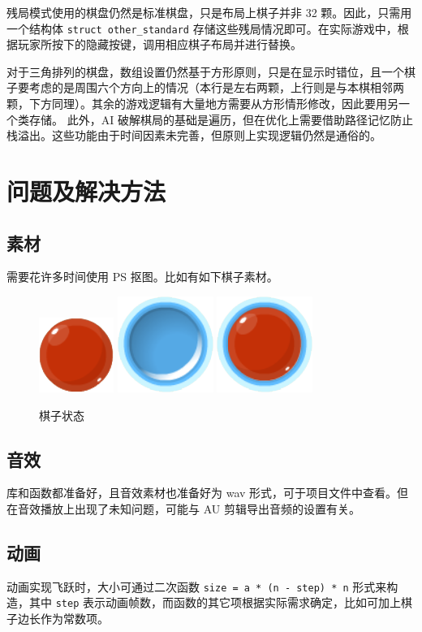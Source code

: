 \documentclass[12pt,a4paper,twoside]{ctexart}
\numberwithin{figure}{section}
\numberwithin{equation}{section}
\begin{document}
残局模式使用的棋盘仍然是标准棋盘，只是布局上棋子并非 32 颗。因此，只需用一个结构体 \verb|struct other_standard| 存储这些残局情况即可。在实际游戏中，根据玩家所按下的隐藏按键，调用相应棋子布局并进行替换。

对于三角排列的棋盘，数组设置仍然基于方形原则，只是在显示时错位，且一个棋子要考虑的是周围六个方向上的情况（本行是左右两颗，上行则是与本棋相邻两颗，下方同理）。其余的游戏逻辑有大量地方需要从方形情形修改，因此要用另一个类存储。 此外，AI 破解棋局的基础是遍历，但在优化上需要借助路径记忆防止栈溢出。这些功能由于时间因素未完善，但原则上实现逻辑仍然是通俗的。



\newpage
\section{问题及解决方法}
\subsection{素材}
需要花许多时间使用 PS 抠图。比如有如下棋子素材。

\begin{figure}[ht]
    \centering
    \includegraphics[width=.1\textwidth]{piece.png}
    \quad
    \includegraphics[width=.1\textwidth]
    {piece_moveTo.png}
    \quad
    \includegraphics[width=.1\textwidth]
    {piece_resized.png}
    \caption{棋子状态}
\end{figure}

\subsection{音效}
库和函数都准备好，且音效素材也准备好为 wav 形式，可于项目文件中查看。但在音效播放上出现了未知问题，可能与 AU 剪辑导出音频的设置有关。

\subsection{动画}
动画实现飞跃时，大小可通过二次函数 \verb|size = a * (n - step) * n| 形式来构造，其中 \verb|step| 表示动画帧数，而函数的其它项根据实际需求确定，比如可加上棋子边长作为常数项。
\end{document}
